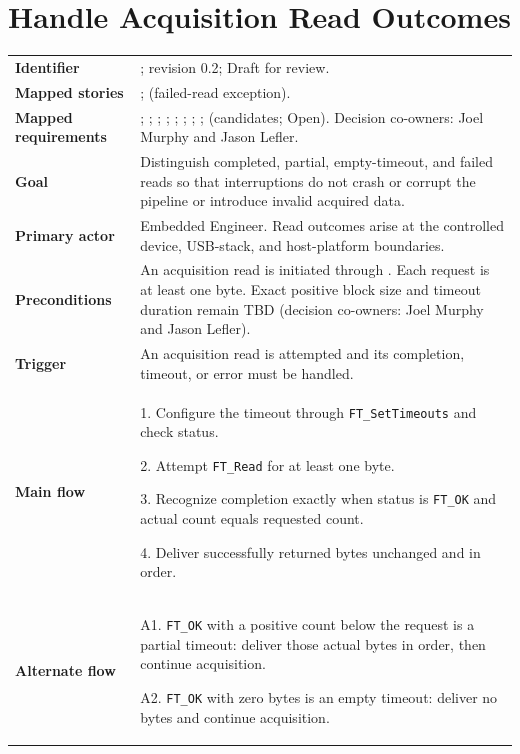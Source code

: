 \section{Handle Acquisition Read Outcomes}
\label{Section:ProjectReadOutcomesUseCase}
\begin{tabularx}{\linewidth}{L{3.5cm}Y}
\toprule
\textbf{Identifier} & \label{Table:ProjectUC002}; revision 0.2; Draft for review.\\
\textbf{Mapped stories} & ;  (failed-read exception).\\
\textbf{Mapped requirements} & ; ; ; ; ; ; ; ;  (candidates; Open). Decision co-owners: Joel Murphy and Jason Lefler.\\
\textbf{Goal} & Distinguish completed, partial, empty-timeout, and failed reads so that interruptions do not crash or corrupt the pipeline or introduce invalid acquired data.\\
\textbf{Primary actor} & Embedded Engineer. Read outcomes arise at the controlled device, USB-stack, and host-platform boundaries.\\
\textbf{Preconditions} & An acquisition read is initiated through . Each request is at least one byte. Exact positive block size and timeout duration remain TBD (decision co-owners: Joel Murphy and Jason Lefler).\\
\textbf{Trigger} & An acquisition read is attempted and its completion, timeout, or error must be handled.\\
\textbf{Main flow} & 1. Configure the timeout through \texttt{FT\_SetTimeouts} and check status.\par 2. Attempt \texttt{FT\_Read} for at least one byte.\par 3. Recognize completion exactly when status is \texttt{FT\_OK} and actual count equals requested count.\par 4. Deliver successfully returned bytes unchanged and in order.\\
\textbf{Alternate flow} & A1. \texttt{FT\_OK} with a positive count below the request is a partial timeout: deliver those actual bytes in order, then continue acquisition.\par A2. \texttt{FT\_OK} with zero bytes is an empty timeout: deliver no bytes and continue acquisition.\\

\end{tabularx}
